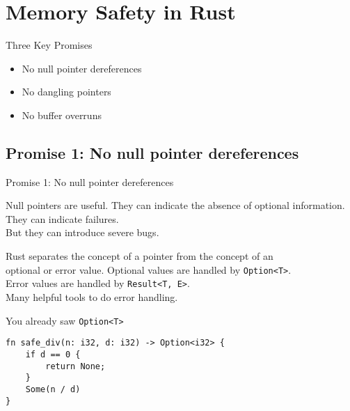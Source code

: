 \section{Memory Safety in Rust}


\begin{frame}{Three Key Promises}

\begin{itemize}
	\item No null pointer dereferences
	\pause
	\item No dangling pointers
	\pause
	\item No buffer overruns
\end{itemize}

\end{frame}


\subsection{Promise 1: No null pointer dereferences}


\begin{frame}{Promise 1: No null pointer dereferences}

\begin{block}{Null pointers are useful.}
They can indicate the absence of optional information.\\
They can indicate failures.\\
\pause
But they can introduce severe bugs.
\end{block}
\vspace{1em}
\pause
\begin{block}{Rust separates the concept of a pointer from the concept of an\\
		optional or error value.}
	Optional values are handled by \texttt{Option<T>}.\\
  Error values are handled by \texttt{Result<T, E>}.\\
	Many helpful tools to do error handling.
\end{block}

\end{frame}


\begin{frame}[fragile]{You already saw \texttt{Option<T>}}
\begin{verbatim}
fn safe_div(n: i32, d: i32) -> Option<i32> {
    if d == 0 {
        return None;
    }
    Some(n / d)
}
\end{verbatim}
\end{frame}

